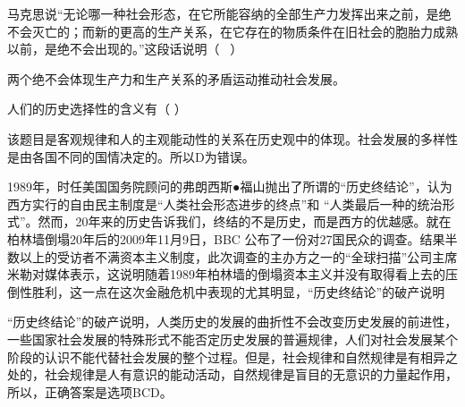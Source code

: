 \question 马克思说``无论哪一种社会形态，在它所能容纳的全部生产力发挥出来之前，是绝不会灭亡的；而新的更高的生产关系，在它存在的物质条件在旧社会的胞胎力成熟以前，是绝不会出现的。''这段话说明（
~）
\par\fourch{\textcolor{red}{生产力的发展是促使社会形态更替的最终原因}}{\textcolor{red}{一种新的生产关系的产生需要客观的物质条件的成熟}}{\textcolor{red}{无论哪一种社会形态，当它还能促进生产力发展时，是不会灭亡的}}{\textcolor{red}{社会形态总是具体的、历史的}}
\begin{solution}两个绝不会体现生产力和生产关系的矛盾运动推动社会发展。
\end{solution}
\question 人们的历史选择性的含义有（ ）
\par{}
\begin{solution}该题目是客观规律和人的主观能动性的关系在历史观中的体现。社会发展的多样性是由各国不同的国情决定的。所以D为错误。
\end{solution}
\question 1989年，时任美国国务院顾问的弗朗西斯●福山抛出了所谓的``历史终结论''，认为西方实行的自由民主制度是``人类社会形态进步的终点''和
``人类最后一种的统治形式''。然而，20年来的历史告诉我们，终结的不是历史，而是西方的优越感。就在柏林墙倒塌20年后的2009年11月9日，BBC
公布了一份对27国民众的调查。结果半数以上的受访者不满资本主义制度，此次调查的主办方之一的``全球扫描''公司主席米勒对媒体表示，这说明随着1989年柏林墙的倒塌资本主义并没有取得看上去的压倒性胜利，这一点在这次金融危机中表现的尤其明显，``历史终结论''的破产说明
\par{}
\begin{solution}``历史终结论''的破产说明，人类历史的发展的曲折性不会改变历史发展的前进性，一些国家社会发展的特殊形式不能否定历史发展的普遍规律，人们对社会发展某个阶段的认识不能代替社会发展的整个过程。但是，社会规律和自然规律是有相异之处的，社会规律是人有意识的能动活动，自然规律是盲目的无意识的力量起作用，所以，正确答案是选项BCD。
\end{solution}
